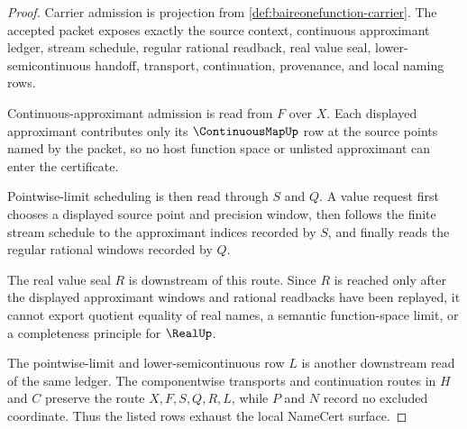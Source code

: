 \begin{proof}
Carrier admission is projection from \autoref{def:baireonefunction-carrier}. The accepted packet exposes exactly the source context, continuous approximant ledger, stream schedule, regular rational readback, real value seal, lower-semicontinuous handoff, transport, continuation, provenance, and local naming rows.

Continuous-approximant admission is read from $F$ over $X$. Each displayed approximant contributes only its $\ContinuousMapUp$ row at the source points named by the packet, so no host function space or unlisted approximant can enter the certificate.

Pointwise-limit scheduling is then read through $S$ and $Q$. A value request first chooses a displayed source point and precision window, then follows the finite stream schedule to the approximant indices recorded by $S$, and finally reads the regular rational windows recorded by $Q$.

The real value seal $R$ is downstream of this route. Since $R$ is reached only after the displayed approximant windows and rational readbacks have been replayed, it cannot export quotient equality of real names, a semantic function-space limit, or a completeness principle for $\RealUp$.

The pointwise-limit and lower-semicontinuous row $L$ is another downstream read of the same ledger. The componentwise transports and continuation routes in $H$ and $C$ preserve the route $X,F,S,Q,R,L$, while $P$ and $N$ record no excluded coordinate. Thus the listed rows exhaust the local NameCert surface.
\end{proof}


